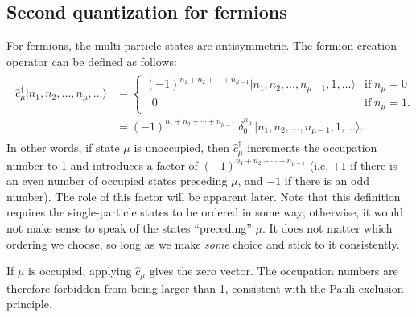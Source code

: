 \documentclass[prx,12pt]{revtex4-2}
\begin{document}
\subsection{Second quantization for fermions}
\label{sec:second_quantized_fermions}

For fermions, the multi-particle states are antisymmetric.  The
fermion creation operator can be defined as follows:
\begin{align}
  \begin{aligned}\hat{c}_\mu^\dagger |n_1, n_2, \dots, n_\mu,\dots\rangle &= \begin{cases}(-1)^{n_1 + n_2 + \cdots + n_{\mu-1}} |n_1, n_2, \dots, n_{\mu-1}, 1, \dots\rangle & \mathrm{if} \; n_\mu = 0 \\ \;\;0 & \mathrm{if}\; n_\mu = 1.
    \end{cases} \\&= (-1)^{n_1 + n_2 + \cdots + n_{\mu-1}}\; \delta^{n_\mu}_0\, \big|n_1, n_2, \dots, n_{\mu-1}, 1, \dots\big\rangle. \end{aligned}
\end{align}
In other words, if state $\mu$ is unoccupied, then
$\hat{c}_\mu^\dagger$ increments the occupation number to 1 and
introduces a factor of $(-1)^{n_1 + n_2 + \cdots + n_{\mu-1}}$ (i.e,
$+1$ if there is an even number of occupied states preceding $\mu$,
and $-1$ if there is an odd number).  The role of this factor will be
apparent later.  Note that this definition requires the
single-particle states to be ordered in some way; otherwise, it would
not make sense to speak of the states ``preceding'' $\mu$.  It does
not matter which ordering we choose, so long as we make \textit{some}
choice and stick to it consistently.

If $\mu$ is occupied, applying $\hat{c}_\mu^\dagger$ gives the zero
vector.  The occupation numbers are therefore forbidden from being
larger than 1, consistent with the Pauli exclusion principle.
\end{document}
